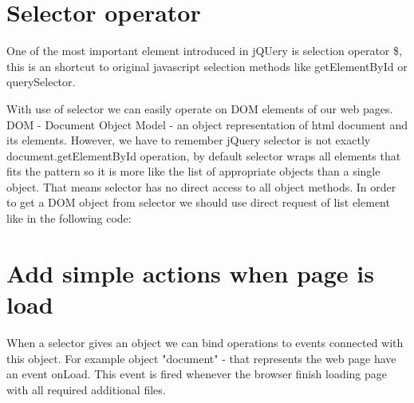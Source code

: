 \section{Selector operator}
One of the most important element introduced in jQUery is selection operator \$, this is an shortcut to original javascript selection methods like getElementById or querySelector.


With use of selector we can easily operate on DOM elements of our web pages. DOM - Document Object Model - an object representation of html document and its elements. However, we have to remember jQuery selector is not exactly document.getElementById operation, by default selector wraps all elements that fits the pattern so it is more like the list of appropriate objects than a single object. That means selector has no direct access to all object methods. In order to get a DOM object from selector we should use direct request of list element like in the following code:



\section{Add simple actions when page is load}
When a selector gives an object we can bind operations to events connected with this object. For example object "document" - that represents the web page have an event onLoad. This event is fired whenever  the browser finish loading page with all required additional files.


